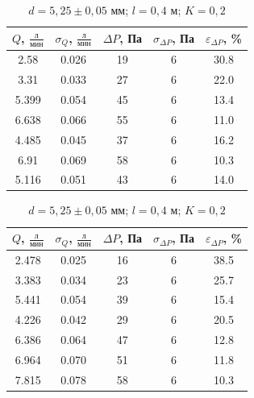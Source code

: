 \documentclass[a4paper,12pt]{article}
\begin{document}
\begin{table}[h!]
\centering
\begin{minipage}{0.48\textwidth}
\centering
    \begin{tabular}{|c|c|c|c|c|}
        \hline
        $Q$, $\frac{\text{л}}{\text{мин}}$ & $\sigma_Q$, $\frac{\text{л}}{\text{мин}}$  & $\Delta P$, Па & $\sigma_{\Delta P}$, Па & $\varepsilon_{\Delta P}$, \% \\
        \hline
        2.58 & 0.026 & 19 & 6 & 30.8 \\ \hline
        3.31 & 0.033 & 27 & 6 & 22.0 \\ \hline
        5.399 & 0.054 & 45 & 6 & 13.4 \\ \hline
        6.638 & 0.066 & 55 & 6 & 11.0 \\ \hline
        4.485 & 0.045 & 37 & 6 & 16.2 \\ \hline
        6.91 & 0.069 & 58 & 6 & 10.3 \\ \hline
        5.116 & 0.051 & 43 & 6 & 14.0 \\ \hline
    \end{tabular}
    \caption{$d = 5,25 \pm 0,05$ мм; $l = 0,5$ м; $K = 0,2$}
\end{minipage}
\hfill
\begin{minipage}{0.48\textwidth}
\centering
    \begin{tabular}{|c|c|c|c|c|}
        \hline
        $Q$, $\frac{\text{л}}{\text{мин}}$ & $\sigma_Q$, $\frac{\text{л}}{\text{мин}}$  & $\Delta P$, Па & $\sigma_{\Delta P}$, Па & $\varepsilon_{\Delta P}$, \% \\
        \hline
        2.478 & 0.025 & 16 & 6 & 38.5 \\ \hline
        3.383 & 0.034 & 23 & 6 & 25.7 \\ \hline
        5.441 & 0.054 & 39 & 6 & 15.4 \\ \hline
        4.226 & 0.042 & 29 & 6 & 20.5 \\ \hline
        6.386 & 0.064 & 47 & 6 & 12.8 \\ \hline
        6.964 & 0.070 & 51 & 6 & 11.8 \\ \hline
        7.815 & 0.078 & 58 & 6 & 10.3 \\ \hline
    \end{tabular}
    \caption{$d = 5,25 \pm 0,05$ мм; $l = 0,4$ м; $K = 0,2$}
\end{minipage}
\end{table}
\end{document}
